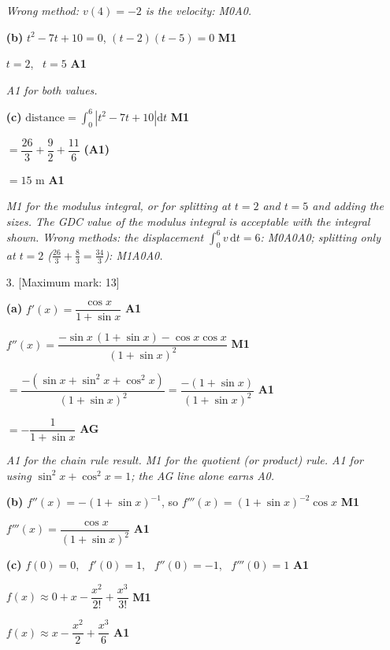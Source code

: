 \documentclass[12pt, twoside]{article}
\begin{document}
\begin{enumerate}[itemsep=0.3cm]
\emph{Wrong method: $v(4) = -2$ is the velocity: M0A0.}

\textbf{(b)} $t^{2} - 7t + 10 = 0$, \quad $(t - 2)(t - 5) = 0$ \hfill \textbf{M1}

$t = 2$, \ $t = 5$ \hfill \textbf{A1}

\emph{A1 for both values.}

\textbf{(c)} $\text{distance} = \displaystyle\int_{0}^{6} \left|t^{2} - 7t + 10\right| \mathrm{d}t$ \hfill \textbf{M1}

$= \dfrac{26}{3} + \dfrac{9}{2} + \dfrac{11}{6}$ \hfill \textbf{(A1)}

$= 15 \text{ m}$ \hfill \textbf{A1}

\emph{M1 for the modulus integral, or for splitting at $t = 2$ and $t = 5$
and adding the sizes. The GDC value of the modulus integral is acceptable
with the integral shown. Wrong methods: the displacement
$\int_{0}^{6} v\,\mathrm{d}t = 6$: M0A0A0; splitting only at $t = 2$
($\frac{26}{3} + \frac{8}{3} = \frac{34}{3}$): M1A0A0.}

\newpage

\item[3.] [Maximum mark: 13]

\textbf{(a)} $f'(x) = \dfrac{\cos x}{1 + \sin x}$ \hfill \textbf{A1}

$f''(x) = \dfrac{-\sin x\,(1 + \sin x) - \cos x \cos x}{(1 + \sin x)^{2}}$ \hfill \textbf{M1}

$= \dfrac{-\left(\sin x + \sin^{2}x + \cos^{2}x\right)}{(1 + \sin x)^{2}} = \dfrac{-(1 + \sin x)}{(1 + \sin x)^{2}}$ \hfill \textbf{A1}

$= -\dfrac{1}{1 + \sin x}$ \hfill \textbf{AG}

\emph{A1 for the chain rule result. M1 for the quotient (or product) rule.
A1 for using $\sin^{2}x + \cos^{2}x = 1$; the AG line alone earns A0.}

\textbf{(b)} $f''(x) = -(1 + \sin x)^{-1}$, so
$f'''(x) = (1 + \sin x)^{-2}\cos x$ \hfill \textbf{M1}

$f'''(x) = \dfrac{\cos x}{(1 + \sin x)^{2}}$ \hfill \textbf{A1}

\textbf{(c)} $f(0) = 0$, \ $f'(0) = 1$, \ $f''(0) = -1$, \ $f'''(0) = 1$ \hfill \textbf{A1}

$f(x) \approx 0 + x - \dfrac{x^{2}}{2!} + \dfrac{x^{3}}{3!}$ \hfill \textbf{M1}

$f(x) \approx x - \dfrac{x^{2}}{2} + \dfrac{x^{3}}{6}$ \hfill \textbf{A1}


\end{enumerate}
\end{document}
